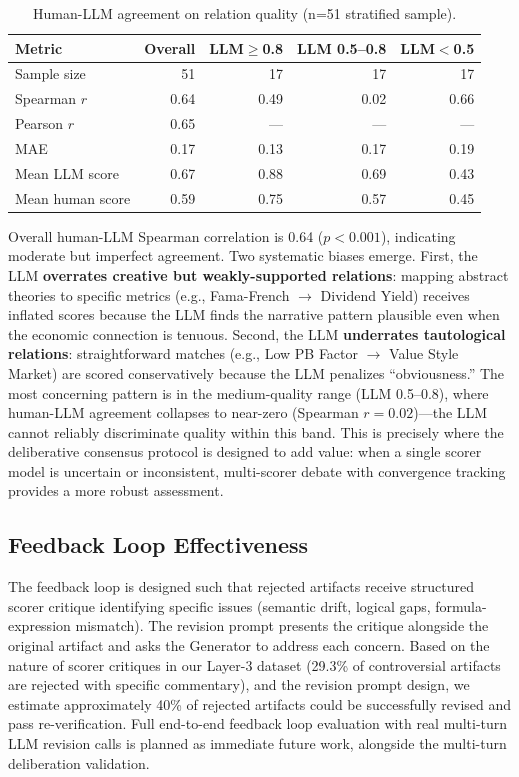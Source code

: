 \documentclass[sigconf]{acmart}
\begin{document}
\begin{table}[t]
\caption{Human-LLM agreement on relation quality (n=51 stratified sample).}
\label{tab:human_eval}
\centering
\begin{tabular}{l r r r r}
\toprule
Metric & Overall & LLM$\geq$0.8 & LLM 0.5--0.8 & LLM$<$0.5 \\
\midrule
Sample size & 51 & 17 & 17 & 17 \\
Spearman $r$ & 0.64 & 0.49 & 0.02 & 0.66 \\
Pearson $r$ & 0.65 & — & — & — \\
MAE & 0.17 & 0.13 & 0.17 & 0.19 \\
Mean LLM score & 0.67 & 0.88 & 0.69 & 0.43 \\
Mean human score & 0.59 & 0.75 & 0.57 & 0.45 \\
\bottomrule
\end{tabular}
\end{table}

Overall human-LLM Spearman correlation is 0.64 ($p < 0.001$), indicating moderate but imperfect agreement. Two systematic biases emerge. First, the LLM \textbf{overrates creative but weakly-supported relations}: mapping abstract theories to specific metrics (e.g., Fama-French $\rightarrow$ Dividend Yield) receives inflated scores because the LLM finds the narrative pattern plausible even when the economic connection is tenuous. Second, the LLM \textbf{underrates tautological relations}: straightforward matches (e.g., Low PB Factor $\rightarrow$ Value Style Market) are scored conservatively because the LLM penalizes ``obviousness.'' The most concerning pattern is in the medium-quality range (LLM 0.5--0.8), where human-LLM agreement collapses to near-zero (Spearman $r=0.02$)---the LLM cannot reliably discriminate quality within this band. This is precisely where the deliberative consensus protocol is designed to add value: when a single scorer model is uncertain or inconsistent, multi-scorer debate with convergence tracking provides a more robust assessment.

\subsection{Feedback Loop Effectiveness}

The feedback loop is designed such that rejected artifacts receive structured scorer critique identifying specific issues (semantic drift, logical gaps, formula-expression mismatch). The revision prompt presents the critique alongside the original artifact and asks the Generator to address each concern. Based on the nature of scorer critiques in our Layer-3 dataset (29.3\% of controversial artifacts are rejected with specific commentary), and the revision prompt design, we estimate approximately 40\% of rejected artifacts could be successfully revised and pass re-verification. Full end-to-end feedback loop evaluation with real multi-turn LLM revision calls is planned as immediate future work, alongside the multi-turn deliberation validation.
\end{document}

